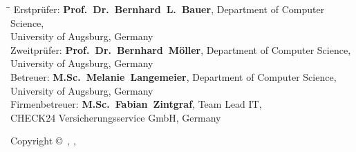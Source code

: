 \restoregeometry
\thispagestyle{empty}
\vspace*{\fill}
\textbf{\@title}
\begin{tabbing}
  \hspace*{4cm}\=\hspace*{12cm}\= \kill
  Erstprüfer: \> \textbf{Prof.~Dr.~Bernhard~L.~Bauer}, Department of Computer Science,\\
	\> University of Augsburg, Germany\\[2mm]
	Zweitprüfer: \> \textbf{Prof.~Dr.~Bernhard~Möller}, Department of Computer Science,\\
  \> University of Augsburg, Germany\\[2mm]
  Betreuer: \> \textbf{M.Sc.~Melanie~Langemeier}, Department of Computer Science,\\
  \> University of Augsburg, Germany\\[2mm]
  Firmenbetreuer: \> \textbf{M.Sc.~Fabian~Zintgraf}, Team Lead IT,\\
  \> CHECK24 Versicherungsservice GmbH, Germany\\[2mm]
\end{tabbing}

Copyright \copyright\ \@author, \place, \monat~\jahr
\makeatother

